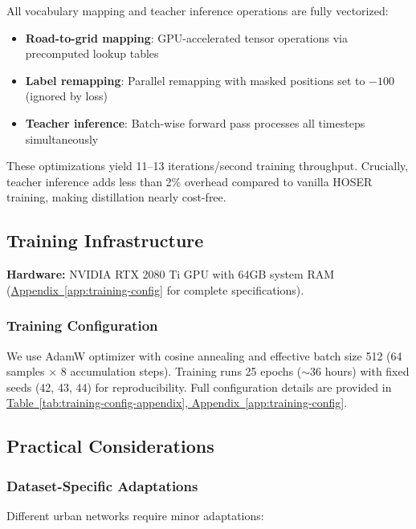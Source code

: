 All vocabulary mapping and teacher inference operations are fully vectorized:

\begin{itemize}[noitemsep,topsep=0pt]
\item \textbf{Road-to-grid mapping}: GPU-accelerated tensor operations via precomputed lookup tables
\item \textbf{Label remapping}: Parallel remapping with masked positions set to $-100$ (ignored by loss)
\item \textbf{Teacher inference}: Batch-wise forward pass processes all timesteps simultaneously
\end{itemize}

These optimizations yield 11--13 iterations/second training throughput. Crucially, teacher inference adds less than 2\% overhead compared to vanilla HOSER training, making distillation nearly cost-free.

\subsection{Training Infrastructure}
\label{sec:impl-infra}

\textbf{Hardware:} NVIDIA RTX 2080 Ti GPU with 64GB system RAM (\hyperref[app:training-config]{Appendix~\ref*{app:training-config}} for complete specifications).

\subsubsection{Training Configuration}

We use AdamW optimizer with cosine annealing and effective batch size 512 (64 samples $\times$ 8 accumulation steps). Training runs 25 epochs ($\sim$36 hours) with fixed seeds (42, 43, 44) for reproducibility. Full configuration details are provided in \hyperref[app:training-config]{Table~\ref*{tab:training-config-appendix}, Appendix~\ref*{app:training-config}}.

\subsection{Practical Considerations}
\label{sec:impl-practical}

\subsubsection{Dataset-Specific Adaptations}

Different urban networks require minor adaptations:

